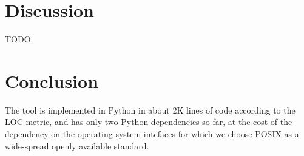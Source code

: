 \documentclass[a4paper,12pt,twocolumn]{article}
\begin{document}
\section{Discussion}

TODO

\section{Conclusion}

The tool is implemented in Python in about 2K lines of code according to the LOC
metric, and has only two Python dependencies so far, at the cost of the
dependency on the operating system intefaces for which we choose POSIX as a
wide-spread openly available standard.

\printbibliography
\end{document}
